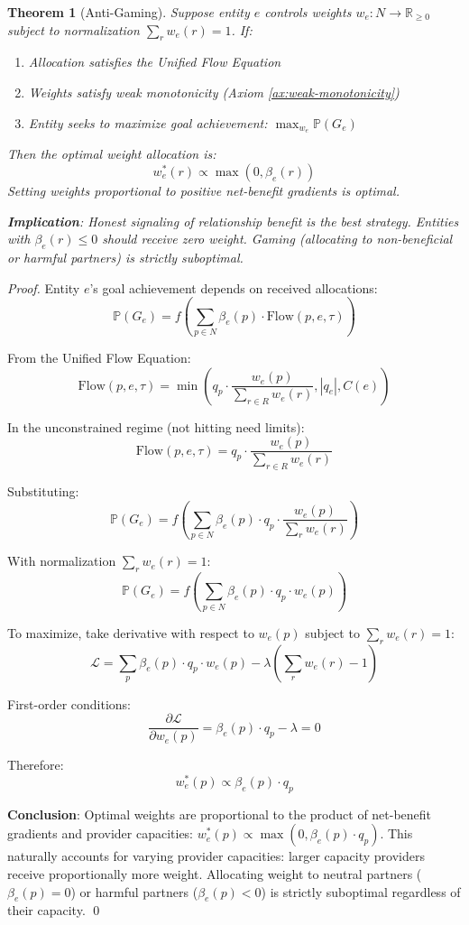 \documentclass[11pt]{article}
\newtheorem{theorem}{Theorem}
\begin{document}
\begin{theorem}[Anti-Gaming]
\label{thm:anti-gaming-commons}
Suppose entity $e$ controls weights $w_e: N \to \mathbb{R}_{\geq 0}$ subject to normalization $\sum_r w_e(r) = 1$. If:
\begin{enumerate}
\item Allocation satisfies the Unified Flow Equation
\item Weights satisfy weak monotonicity (Axiom \ref{ax:weak-monotonicity})
\item Entity seeks to maximize goal achievement: $\max_{w_e} \mathbb{P}(G_e)$
\end{enumerate}

Then the optimal weight allocation is:
\[
w_e^*(r) \propto \max(0, \beta_e(r))
\]
Setting weights proportional to \emph{positive} net-benefit gradients is optimal.

\textbf{Implication}: Honest signaling of relationship benefit is the best strategy. Entities with $\beta_e(r) \leq 0$ should receive zero weight. Gaming (allocating to non-beneficial or harmful partners) is strictly suboptimal.
\end{theorem}

\begin{proof}
Entity $e$'s goal achievement depends on received allocations:
\[
\mathbb{P}(G_e) = f\left(\sum_{p \in N} \beta_e(p) \cdot \text{Flow}(p, e, \tau)\right)
\]

From the Unified Flow Equation:
\[
\text{Flow}(p, e, \tau) = \min\left( q_p \cdot \frac{w_e(p)}{\sum_{r \in R} w_e(r)}, |q_e|, C(e) \right)
\]

In the unconstrained regime (not hitting need limits):
\[
\text{Flow}(p, e, \tau) = q_p \cdot \frac{w_e(p)}{\sum_{r \in R} w_e(r)}
\]

Substituting:
\[
\mathbb{P}(G_e) = f\left(\sum_{p \in N} \beta_e(p) \cdot q_p \cdot \frac{w_e(p)}{\sum_{r} w_e(r)}\right)
\]

With normalization $\sum_r w_e(r) = 1$:
\[
\mathbb{P}(G_e) = f\left(\sum_{p \in N} \beta_e(p) \cdot q_p \cdot w_e(p)\right)
\]

To maximize, take derivative with respect to $w_e(p)$ subject to $\sum_r w_e(r) = 1$:
\[
\mathcal{L} = \sum_{p} \beta_e(p) \cdot q_p \cdot w_e(p) - \lambda\left(\sum_r w_e(r) - 1\right)
\]

First-order conditions:
\[
\frac{\partial \mathcal{L}}{\partial w_e(p)} = \beta_e(p) \cdot q_p - \lambda = 0
\]

Therefore:
\[
w_e^*(p) \propto \beta_e(p) \cdot q_p
\]

\textbf{Conclusion}: Optimal weights are proportional to the product of net-benefit gradients and provider capacities: $w_e^*(p) \propto \max(0, \beta_e(p) \cdot q_p)$. This naturally accounts for varying provider capacities: larger capacity providers receive proportionally more weight. Allocating weight to neutral partners ($\beta_e(p) = 0$) or harmful partners ($\beta_e(p) < 0$) is strictly suboptimal regardless of their capacity. \qed
\end{proof}
\end{document}
